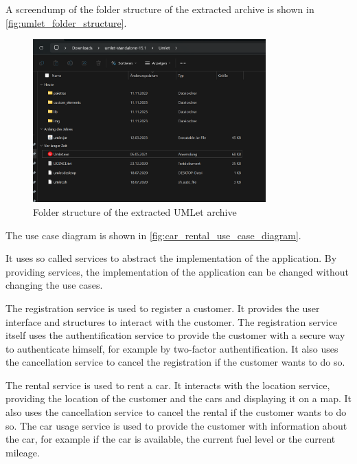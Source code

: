 A screendump of the folder structure of the extracted archive is shown in \autoref{fig:umlet_folder_structure}.
\begin{figure}
    \centering
    \includegraphics[width=0.8\textwidth]{figures/goLang/carRental/carRental_umletInstallation.png}
    \caption{Folder structure of the extracted UMLet archive}
    \label{fig:umlet_folder_structure}
\end{figure}

The use case diagram is shown in \autoref{fig:car_rental_use_case_diagram}.

It uses so called services to abstract the implementation of the application.
By providing services, the implementation of the application can be changed without changing the use cases.

The registration service is used to register a customer.
It provides the user interface and structures to interact with the customer.
The registration service itself uses the authentification service to provide the customer with a secure way to authenticate himself, for example by two-factor authentification.
It also uses the cancellation service to cancel the registration if the customer wants to do so.

The rental service is used to rent a car.
It interacts with the location service, providing the location of the customer and the cars and displaying it on a map.
It also uses the cancellation service to cancel the rental if the customer wants to do so.
The car usage service is used to provide the customer with information about the car, for example if the car is available, the current fuel level or the current mileage.

